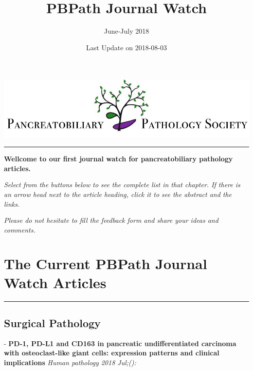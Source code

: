 \documentclass[]{article}
\title{PBPath Journal Watch}
\subtitle{June-July 2018}
\author{}
\date{Last Update on 2018-08-03}
\begin{document}
\maketitle

{
\setcounter{tocdepth}{2}
\tableofcontents
}
\href{http://pbpath.org/}{\includegraphics{figures/PBP_header_logo.jpg}}

\begin{center}\rule{0.5\linewidth}{\linethickness}\end{center}

\textbf{Wellcome to our first journal watch for pancreatobiliary
pathology articles.}

\emph{Select from the buttons below to see the complete list in that
chapter. If there is an arrow head next to the article heading, click it
to see the abstract and the links.}

\emph{Please do not hesitate to fill the feedback form and share your
ideas and comments.}

\hypertarget{the-current-pbpath-journal-watch-articles}{%
\section{The Current PBPath Journal Watch
Articles}\label{the-current-pbpath-journal-watch-articles}}

\begin{center}\rule{0.5\linewidth}{\linethickness}\end{center}

\hypertarget{surgical-pathology}{%
\subsection{Surgical Pathology}\label{surgical-pathology}}

 - \textbf{PD-1, PD-L1 and CD163 in pancreatic undifferentiated
carcinoma with osteoclast-like giant cells: expression patterns and
clinical implications} \emph{Human pathology 2018 Jul;():}
\end{document}
